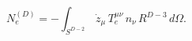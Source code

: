 \begin{equation}
N_{e}^{(D)}=-\int_{S^{D-2}}\, \dot{z}_{\mu}\,T_{e}^{\mu \nu}\, n_{\nu} \, R^{D-3}\,
 d\Omega.
\end{equation}

